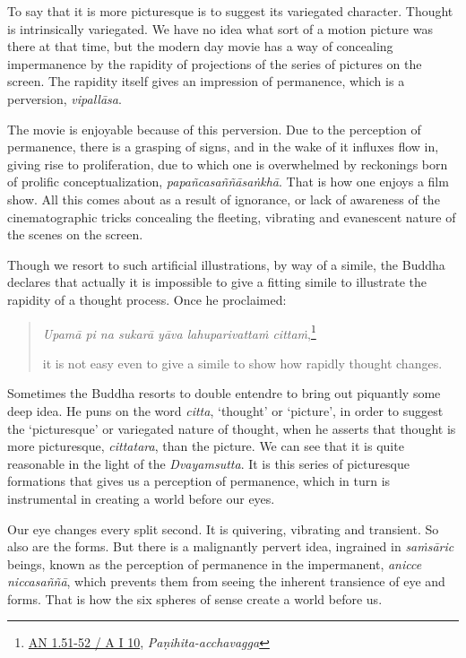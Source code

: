 To say that it is more picturesque is to suggest its variegated character. Thought is intrinsically variegated. We have no idea what sort of a motion picture was there at that time, but the modern day movie has a way of concealing impermanence by the rapidity of projections of the series of pictures on the screen. The rapidity itself gives an impression of permanence, which is a perversion, \emph{vipallāsa}.

The movie is enjoyable because of this perversion. Due to the perception of permanence, there is a grasping of signs, and in the wake of it influxes flow in, giving rise to proliferation, due to which one is overwhelmed by reckonings born of prolific conceptualization, \emph{papañcasaññāsaṅkhā}. That is how one enjoys a film show. All this comes about as a result of ignorance, or lack of awareness of the cinematographic tricks concealing the fleeting, vibrating and evanescent nature of the scenes on the screen.

Though we resort to such artificial illustrations, by way of a simile, the Buddha declares that actually it is impossible to give a fitting simile to illustrate the rapidity of a thought process. Once he proclaimed:

\begin{quote}
\emph{Upamā pi na sukarā yāva lahuparivattaṁ cittaṁ},\footnote{\href{https://suttacentral.net/an1.51-60/pli/ms}{AN 1.51-52 / A I 10}, \emph{Paṇihita-acchavagga}}

it is not easy even to give a simile to show how rapidly thought changes.
\end{quote}

Sometimes the Buddha resorts to double entendre to bring out piquantly some deep idea. He puns on the word \emph{citta}, `thought' or `picture', in order to suggest the `picturesque' or variegated nature of thought, when he asserts that thought is more picturesque, \emph{cittatara}, than the picture. We can see that it is quite reasonable in the light of the \emph{Dvayamsutta}. It is this series of picturesque formations that gives us a perception of permanence, which in turn is instrumental in creating a world before our eyes.

Our eye changes every split second. It is quivering, vibrating and transient. So also are the forms. But there is a malignantly pervert idea, ingrained in \emph{saṁsāric} beings, known as the perception of permanence in the impermanent, \emph{anicce niccasaññā}, which prevents them from seeing the inherent transience of eye and forms. That is how the six spheres of sense create a world before us.

